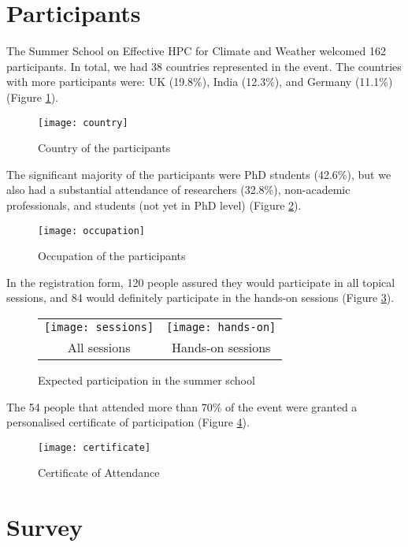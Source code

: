\section{Participants}

The Summer School on Effective HPC for Climate and Weather welcomed 162 participants. In total, we had 38 countries represented in the event. The countries with more participants were: UK (19.8\%), India (12.3\%), and Germany (11.1\%) (Figure \ref{fig:country}).

\begin{figure}[H]
\centering
\texttt{[image: country]}
\caption{\label{fig:country} Country of the participants}
\end{figure}

The significant majority of the participants were PhD students (42.6\%), but we also had a substantial attendance of researchers (32.8\%), non-academic professionals, and students (not yet in PhD level) (Figure \ref{fig:occupation}).

\begin{figure}[H]
\centering
\texttt{[image: occupation]}
\caption{\label{fig:occupation} Occupation of the participants}
\end{figure}

In the registration form, 120 people assured they would participate in all topical sessions, and 84 would definitely participate in the hands-on sessions (Figure \ref{fig:part}).

\begin{figure}[H]
\centering
\begin{tabular}{cc}
\texttt{[image: sessions]} &
\texttt{[image: hands-on]} \\
\hspace{-3cm} All sessions &
Hands-on sessions
\end{tabular}
\caption{\label{fig:part} Expected participation in the summer school}
\end{figure}


The 54 people that attended more than 70\% of the event were granted a personalised certificate of participation (Figure \ref{fig:cert}).

\begin{figure}[H]
\centering
\texttt{[image: certificate]}
\caption{\label{fig:cert} Certificate of Attendance}
\end{figure}

\section{Survey}


